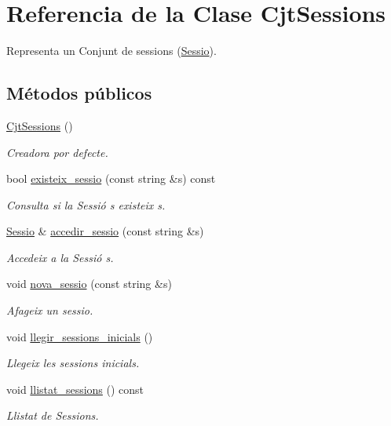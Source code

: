 \hypertarget{class_cjt_sessions}{}\section{Referencia de la Clase Cjt\+Sessions}
\label{class_cjt_sessions}


Representa un Conjunt de sessions (\mbox{\hyperlink{class_sessio}{Sessio}}).  


\subsection*{Métodos públicos}
\begin{DoxyCompactItemize}
\item 
\mbox{\hyperlink{class_cjt_sessions_acfe3023a40e3dcbfeb558466a013ca87}{Cjt\+Sessions}} ()
\begin{DoxyCompactList}\small\item\em Creadora por defecte. \end{DoxyCompactList}\item 
bool \mbox{\hyperlink{class_cjt_sessions_ae0d6dfe6e1bab2746fa03dc852f2f4a9}{existeix\+\_\+sessio}} (const string \&s) const
\begin{DoxyCompactList}\small\item\em Consulta si la Sessió s existeix {\itshape s}. \end{DoxyCompactList}\item 
\mbox{\hyperlink{class_sessio}{Sessio}} \& \mbox{\hyperlink{class_cjt_sessions_a373d89dde7bb62322feb50f3a299d5de}{accedir\+\_\+sessio}} (const string \&s)
\begin{DoxyCompactList}\small\item\em Accedeix a la Sessió {\itshape s}. \end{DoxyCompactList}\item 
void \mbox{\hyperlink{class_cjt_sessions_ac6e00a3727d5ece89965a4f38d707273}{nova\+\_\+sessio}} (const string \&s)
\begin{DoxyCompactList}\small\item\em Afageix un sessio. \end{DoxyCompactList}\item 
void \mbox{\hyperlink{class_cjt_sessions_a4ea0fafab13c9db8fe385f62fb572fc0}{llegir\+\_\+sessions\+\_\+inicials}} ()
\begin{DoxyCompactList}\small\item\em Llegeix les sessions inicials. \end{DoxyCompactList}\item 
void \mbox{\hyperlink{class_cjt_sessions_a1e4f04be3e5da3d8f9091620d56ea355}{llistat\+\_\+sessions}} () const
\begin{DoxyCompactList}\small\item\em Llistat de Sessions. \end{DoxyCompactList}\end{DoxyCompactItemize}


